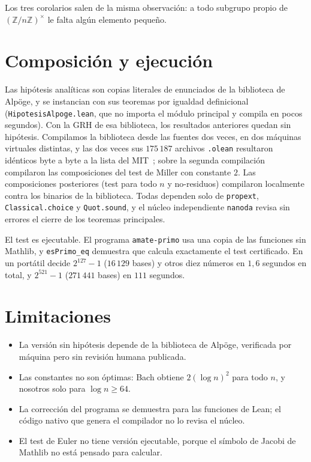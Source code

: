 \documentclass[11pt,a4paper]{amsart}
\theoremstyle{remark}
\newcommand{\Z}{\mathbb{Z}}
\begin{document}
Los tres corolarios salen de la misma observaci\'on: a todo subgrupo propio de $(\Z/n\Z)^\times$ le falta alg\'un elemento peque\~no.

\section{Composici\'on y ejecuci\'on}

Las hip\'otesis anal\'iticas son copias literales de enunciados de la biblioteca de Alp\"oge, y se instancian con sus teoremas por igualdad definicional (\texttt{HipotesisAlpoge.lean}, que no importa el m\'odulo principal y compila en pocos segundos). Con la GRH de esa biblioteca, los resultados anteriores quedan sin hip\'otesis. Compilamos la biblioteca desde las fuentes dos veces, en dos m\'aquinas virtuales distintas, y las dos veces sus $175\,187$ archivos \texttt{.olean} resultaron id\'enticos byte a byte a la lista del MIT~\cite{MIT}; sobre la segunda compilaci\'on compilaron las composiciones del test de Miller con constante $2$. Las composiciones posteriores (test para todo $n$ y no-residuos) compilaron localmente contra los binarios de la biblioteca. Todas dependen solo de \texttt{propext}, \texttt{Classical.choice} y \texttt{Quot.sound}, y el n\'ucleo independiente \texttt{nanoda} revisa sin errores el cierre de los teoremas principales.

El test es ejecutable. El programa \texttt{amate-primo} usa una copia de las funciones sin Mathlib, y \texttt{esPrimo\_eq} demuestra que calcula exactamente el test certificado. En un port\'atil decide $2^{127}-1$ ($16\,129$ bases) y otros diez n\'umeros en $1{,}6$ segundos en total, y $2^{521}-1$ ($271\,441$ bases) en $111$ segundos.

\section{Limitaciones}

\begin{itemize}
\item La versi\'on sin hip\'otesis depende de la biblioteca de Alp\"oge, verificada por m\'aquina pero sin revisi\'on humana publicada.
\item Las constantes no son \'optimas: Bach obtiene $2(\log n)^2$ para todo $n$, y nosotros solo para $\log n\ge64$.
\item La correcci\'on del programa se demuestra para las funciones de Lean; el c\'odigo nativo que genera el compilador no lo revisa el n\'ucleo.
\item El test de Euler no tiene versi\'on ejecutable, porque el s\'imbolo de Jacobi de Mathlib no est\'a pensado para calcular.
\end{itemize}
\end{document}
